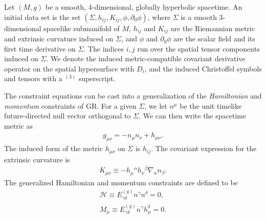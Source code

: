 \documentclass{ws-ijmpd}
\begin{document}
Let $\left(M,g\right)$ be a smooth, 4-dimensional, globally hyperbolic
spacetime. An initial data set is the set 
$\left(\Sigma,h_{ij},K_{ij},\phi,\partial_0\phi\right)$, 
where $\Sigma$ is a smooth 3-dimensional spacelike submanifold
of $M$, $h_{ij}$ and $K_{ij}$ are
the Riemannian metric and extrinsic curvature induced on $\Sigma$,
and $\phi$ and $\partial_0\phi$ are the scalar field and its first time
derivative on $\Sigma$.
The indices $i,j$ run over the spatial tensor components induced
on $\Sigma$.
We denote the induced metric-compatible covariant derivative
operator on the spatial hypersurface with $D_i$, and the
induced Christoffel symbols and tensors with a ${}^{(3)}$ superscript.

The constraint equations can be cast into a generalization
of the \emph{Hamiltonian} and \emph{momentum} constraints of GR.
For a given $\Sigma$, we let $n^{\mu}$ be the unit timelike future-directed
null vector orthogonal to $\Sigma$.
We can then write the spacetime metric as 
\begin{align}
   \label{eq:covariant_3p1_decomp}
   g_{\mu\nu}
   =
   -
   n_{\mu}n_{\nu}
   +
   h_{\mu\nu}
   .
\end{align}
The induced form of the metric $h_{\mu\nu}$ on $\Sigma$ is $h_{ij}$.
The covariant expression for the extrinsic curvature is
\begin{align}
   K_{\mu\nu}
   \equiv
   -
   h_{\mu}{}^{\alpha}h_{\nu}{}^{\beta}\nabla_{\alpha}n_{\beta}
   .
\end{align}
The generalized Hamiltonian and momentum constraints are defined to be 
\begin{align}
   \label{eq:general_hamiltonian_constraint}
   \mathcal{H}
   \equiv
   E^{(g)}_{\gamma\delta}n^{\gamma}n^{\delta}
   =
   0
   ,\\
   \label{eq:general_momentum_constraint}
   M_{\mu}
   \equiv
   E^{(g)}_{\gamma\delta}n^{\gamma}h^{\delta}_{\mu}
   =
   0
   .
\end{align}
\end{document}
